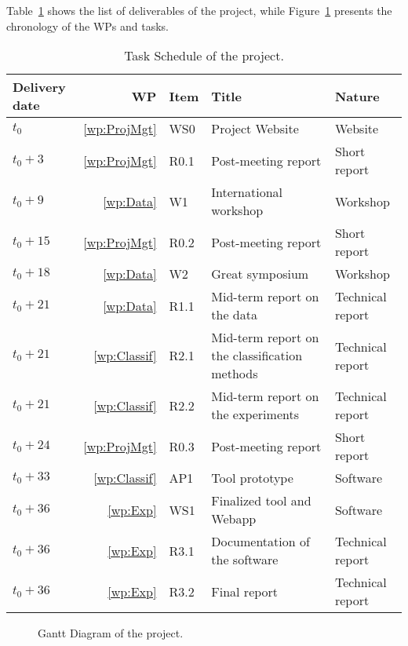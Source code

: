 Table~\ref{tab:schedule} shows the list of deliverables of the project, while Figure~\ref{fig:gantt} presents the chronology of the WPs and tasks.

\begin{table}[htb!]
	\centering
	\begin{tabular}{l r l p{8cm} l}
		\hline
        \rowcolor{headcolor!20}
		\textbf{Delivery date} & \textbf{WP} & \textbf{Item} & \textbf{Title} & \textbf{Nature} \\
		\hline
		$t_0$ & \ref{wp:ProjMgt} & WS0 & Project Website & Website \\
		$t_0+3$ & \ref{wp:ProjMgt} & R0.1 & Post-meeting report & Short report \\
		$t_0+9$ & \ref{wp:Data} & W1 & International workshop & Workshop \\
		$t_0+15$ & \ref{wp:ProjMgt} & R0.2 & Post-meeting report & Short report \\
		$t_0+18$ & \ref{wp:Data} & W2 & Great symposium & Workshop \\
		$t_0+21$ & \ref{wp:Data} & R1.1 & Mid-term report on the data & Technical report \\
		$t_0+21$ & \ref{wp:Classif} & R2.1 & Mid-term report on the classification methods & Technical report \\
		$t_0+21$ & \ref{wp:Classif} & R2.2 & Mid-term report on the experiments & Technical report \\
		$t_0+24$ & \ref{wp:ProjMgt} & R0.3 & Post-meeting report & Short report \\
		$t_0+33$ & \ref{wp:Classif} & AP1 & Tool prototype & Software \\
		$t_0+36$ & \ref{wp:Exp} & WS1 & Finalized tool and Webapp & Software \\
		$t_0+36$ & \ref{wp:Exp} & R3.1 & Documentation of the software & Technical report \\
		$t_0+36$ & \ref{wp:Exp} & R3.2 & Final report & Technical report \\
		\hline
	\end{tabular}
	\caption{Task Schedule of the project.}
    \label{tab:schedule}
\end{table}

\begin{figure}[!ht]
	\centering
    
	\caption{Gantt Diagram of the project.}
    \label{fig:gantt}
\end{figure}









